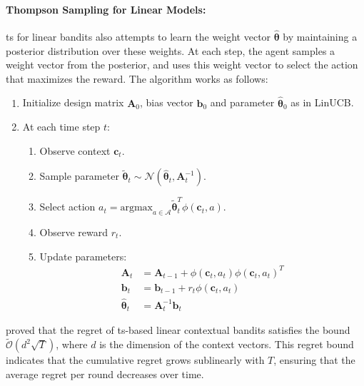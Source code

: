 \paragraph{Thompson Sampling for Linear Models:} \acf{ts} for linear bandits \citep{agrawal2013thompson} also attempts to learn the weight vector $\hat{\boldsymbol{\theta}}$ by maintaining a posterior distribution over these weights. At each step, the agent samples a weight vector from the posterior, and uses this weight vector to select the action that maximizes the reward. The algorithm works as follows:
    \begin{enumerate}
    \item Initialize design matrix $\mathbf{A}_0$, bias vector $\mathbf{b}_0$ and parameter $\hat{\boldsymbol{\theta}}_0$ as in LinUCB. 
    \item At each time step $t$:
      \begin{enumerate}
        \item Observe context $\mathbf{c}_t$.
        \item Sample parameter $\widetilde{\boldsymbol{\theta}}_t \sim \mathcal{N}(\hat{\boldsymbol{\theta}}_t, \mathbf{A}_t^{-1})$. 
        \item Select action $a_t = \text{argmax}_{a \in \mathcal{A}} \widetilde{\boldsymbol{\theta}}_t^T \phi(\mathbf{c}_t, a)$.
        \item Observe reward $r_t$.
        \item Update parameters:
              \begin{align*}
                  \mathbf{A}_t &= \mathbf{A}_{t-1} + \phi(\mathbf{c}_t, a_t) \phi(\mathbf{c}_t, a_t)^T \\
                  \mathbf{b}_t &= \mathbf{b}_{t-1} + r_t \phi(\mathbf{c}_t, a_t) \\
                  \hat{\boldsymbol{\theta}}_t &= \mathbf{A}_t^{-1} \mathbf{b}_t
              \end{align*}
      \end{enumerate}
    \end{enumerate}
\citet{agrawal2013thompson} proved that the regret of \ac{ts}-based linear contextual bandits satisfies the bound $\tilde{\mathcal{O}}(d^2 \sqrt{T})$, where \( d \) is the dimension of the context vectors. This regret bound indicates that the cumulative regret grows sublinearly with \( T \), ensuring that the average regret per round decreases over time. 

